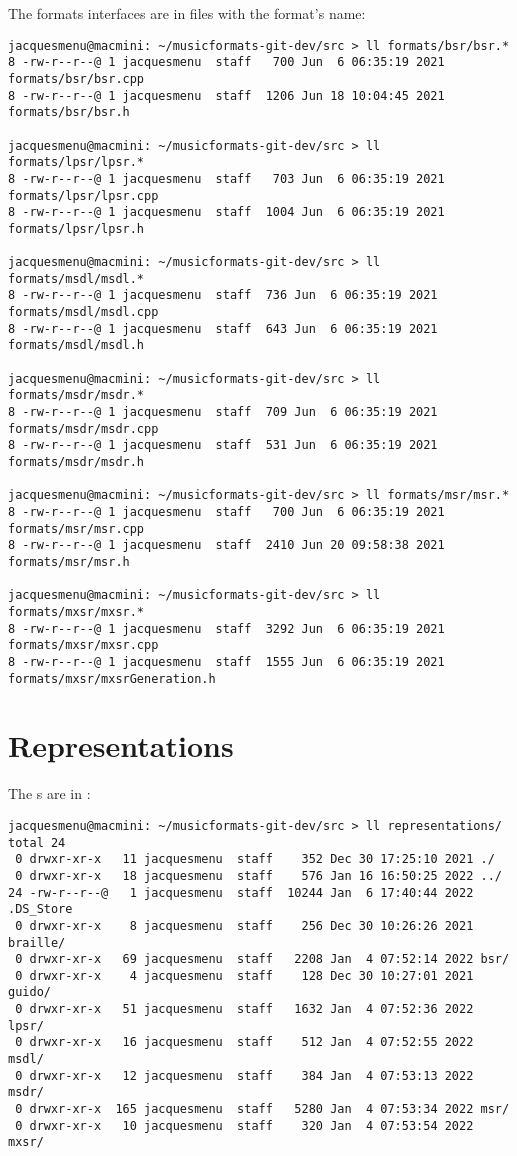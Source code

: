 The formats interfaces are in files with the format's name:
\begin{lstlisting}[language=Terminal]
jacquesmenu@macmini: ~/musicformats-git-dev/src > ll formats/bsr/bsr.*
8 -rw-r--r--@ 1 jacquesmenu  staff   700 Jun  6 06:35:19 2021 formats/bsr/bsr.cpp
8 -rw-r--r--@ 1 jacquesmenu  staff  1206 Jun 18 10:04:45 2021 formats/bsr/bsr.h

jacquesmenu@macmini: ~/musicformats-git-dev/src > ll formats/lpsr/lpsr.*
8 -rw-r--r--@ 1 jacquesmenu  staff   703 Jun  6 06:35:19 2021 formats/lpsr/lpsr.cpp
8 -rw-r--r--@ 1 jacquesmenu  staff  1004 Jun  6 06:35:19 2021 formats/lpsr/lpsr.h

jacquesmenu@macmini: ~/musicformats-git-dev/src > ll formats/msdl/msdl.*
8 -rw-r--r--@ 1 jacquesmenu  staff  736 Jun  6 06:35:19 2021 formats/msdl/msdl.cpp
8 -rw-r--r--@ 1 jacquesmenu  staff  643 Jun  6 06:35:19 2021 formats/msdl/msdl.h

jacquesmenu@macmini: ~/musicformats-git-dev/src > ll formats/msdr/msdr.*
8 -rw-r--r--@ 1 jacquesmenu  staff  709 Jun  6 06:35:19 2021 formats/msdr/msdr.cpp
8 -rw-r--r--@ 1 jacquesmenu  staff  531 Jun  6 06:35:19 2021 formats/msdr/msdr.h

jacquesmenu@macmini: ~/musicformats-git-dev/src > ll formats/msr/msr.*
8 -rw-r--r--@ 1 jacquesmenu  staff   700 Jun  6 06:35:19 2021 formats/msr/msr.cpp
8 -rw-r--r--@ 1 jacquesmenu  staff  2410 Jun 20 09:58:38 2021 formats/msr/msr.h

jacquesmenu@macmini: ~/musicformats-git-dev/src > ll formats/mxsr/mxsr.*
8 -rw-r--r--@ 1 jacquesmenu  staff  3292 Jun  6 06:35:19 2021 formats/mxsr/mxsr.cpp
8 -rw-r--r--@ 1 jacquesmenu  staff  1555 Jun  6 06:35:19 2021 formats/mxsr/mxsrGeneration.h
\end{lstlisting}


\section{Representations}

The \representation s are in :
\begin{lstlisting}[language=Terminal]
jacquesmenu@macmini: ~/musicformats-git-dev/src > ll representations/
total 24
 0 drwxr-xr-x   11 jacquesmenu  staff    352 Dec 30 17:25:10 2021 ./
 0 drwxr-xr-x   18 jacquesmenu  staff    576 Jan 16 16:50:25 2022 ../
24 -rw-r--r--@   1 jacquesmenu  staff  10244 Jan  6 17:40:44 2022 .DS_Store
 0 drwxr-xr-x    8 jacquesmenu  staff    256 Dec 30 10:26:26 2021 braille/
 0 drwxr-xr-x   69 jacquesmenu  staff   2208 Jan  4 07:52:14 2022 bsr/
 0 drwxr-xr-x    4 jacquesmenu  staff    128 Dec 30 10:27:01 2021 guido/
 0 drwxr-xr-x   51 jacquesmenu  staff   1632 Jan  4 07:52:36 2022 lpsr/
 0 drwxr-xr-x   16 jacquesmenu  staff    512 Jan  4 07:52:55 2022 msdl/
 0 drwxr-xr-x   12 jacquesmenu  staff    384 Jan  4 07:53:13 2022 msdr/
 0 drwxr-xr-x  165 jacquesmenu  staff   5280 Jan  4 07:53:34 2022 msr/
 0 drwxr-xr-x   10 jacquesmenu  staff    320 Jan  4 07:53:54 2022 mxsr/
\end{lstlisting}


